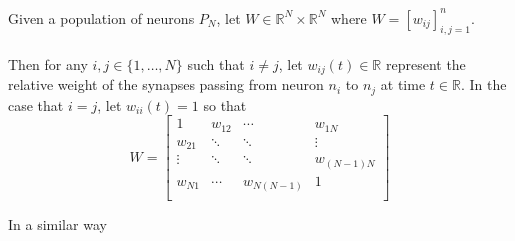 \documentclass{article}
\begin{document}
\begin{definition}[$W = \textbf{coupling strength matrix}$]\label{W}
Given a population of neurons $P_{N}$, let $W \in \mathbb{R}^{N} \times \mathbb{R}^{N}$ where $W = [w_{ij}]_{i,j=1}^{n}$. \\
\\
Then for any $i,j \in \{ 1, \dots, N \}$ such that $i \ne j$, let $w_{ij}(t) \in \mathbb{R}$ represent the relative weight of the synapses passing from neuron $n_{i}$ to $n_{j}$ at time $t\in\mathbb{R}$. In the case that $i=j$, let $w_{ii}(t)=1$ so that
\[ W =
\begin{bmatrix}
1	&	w_{12}	& \cdots & w_{1N} \\
w_{21}	& \ddots & \ddots & \vdots \\
\vdots	& \ddots & \ddots & w_{(N-1)N} \\
w_{N1}	& \cdots & w_{N(N-1)} & 1 \\
\end{bmatrix}\]
\end{definition}

In a similar way
\end{document}
